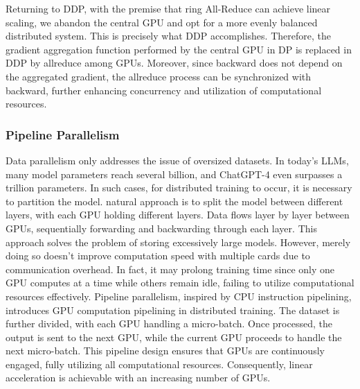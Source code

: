 \documentclass[conference]{IEEEtran}
\begin{document}
Returning to DDP, with the premise that ring All-Reduce can achieve linear scaling, we abandon the central GPU and opt for a more evenly balanced distributed system. This is precisely what DDP accomplishes. Therefore, the gradient aggregation function performed by the central GPU in DP is replaced in DDP by allreduce among GPUs. Moreover, since backward does not depend on the aggregated gradient, the allreduce process can be synchronized with backward, further enhancing concurrency and utilization of computational resources.

\subsubsection{Pipeline Parallelism}
Data parallelism only addresses the issue of oversized datasets. In today's LLMs, many model parameters reach several billion, and ChatGPT-4 even surpasses a trillion parameters. In such cases, for distributed training to occur, it is necessary to partition the model.
natural approach is to split the model between different layers, with each GPU holding different layers. Data flows layer by layer between GPUs, sequentially forwarding and backwarding through each layer. This approach solves the problem of storing excessively large models. However, merely doing so doesn't improve computation speed with multiple cards due to communication overhead. In fact, it may prolong training time since only one GPU computes at a time while others remain idle, failing to utilize computational resources effectively.
Pipeline parallelism, inspired by CPU instruction pipelining, introduces GPU computation pipelining in distributed training. The dataset is further divided, with each GPU handling a micro-batch. Once processed, the output is sent to the next GPU, while the current GPU proceeds to handle the next micro-batch. This pipeline design ensures that GPUs are continuously engaged, fully utilizing all computational resources. Consequently, linear acceleration is achievable with an increasing number of GPUs.
\end{document}
